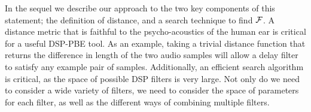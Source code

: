 In the sequel we describe our approach to the two key components of this statement; the definition of distance, and a search technique to find $\mathcal{F}$.
A distance metric that is faithful to the psycho-acoustics of the human ear is critical for a useful DSP-PBE tool.
As an example, taking a trivial distance function that returns the difference in length of the two audio samples will allow a delay filter to satisfy any example pair of samples.
Additionally, an efficient search algorithm is critical, as the space of possible DSP filters is very large.
Not only do we need to consider a wide variety of filters, we need to consider the space of parameters for each filter, as well as the different ways of combining multiple filters.

